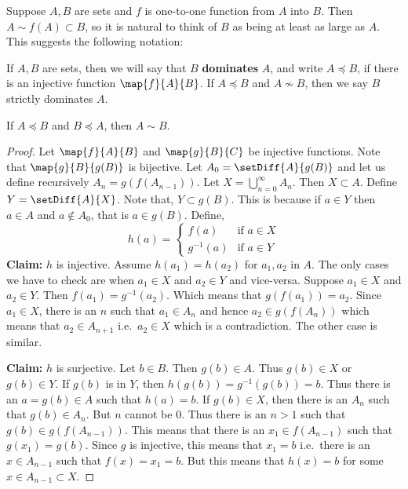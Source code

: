 Suppose $A,B$ are sets and $f$ is one-to-one function from $A$ into $B$. Then $A\sim f(A)\subset B$, so it is
natural to think of $B$ as being at least as large as $A$. This suggests the following notation:
\begin{Definition}
    If $A,B$ are sets, then we will say that $B$ \textbf{dominates} $A$, and write $A \preceq B$, if there is
    an injective function $\map{f}{A}{B}$. If $A\preceq B$ and $A\not\sim B$, then we say $B$ strictly
    dominates $A$.
\end{Definition}
\begin{Theorem}[name=Schroder-Bernstein theorem]
    If $A \preceq B$ and $B \preceq A$, then $A\sim B$.
\end{Theorem}
\begin{proof}
    Let $\map{f}{A}{B}$ and $\map{g}{B}{C}$ be injective functions. Note that $\map{g}{B}{g(B)}$ is bijective.
    Let $A_0 = \setDiff{A}{g(B)}$ and let us define recursively $A_n = g(f(A_{n-1}))$.
    Let $X = \bigcup\limits_{n=0}^{\infty}A_n$. Then $X \subset A$. Define $Y = \setDiff{A}{X}$. Note that, $Y
    \subset g(B)$. This is because if $a \in Y$ then $a \in A$ and $a \not\in A_0$, that is $a \in g(B)$.
    Define,
    \begin{equation*}
	h(a) = 
	\begin{cases}
	    f(a) &\text{if $a\in X$}\\
	    g^{-1}(a) &\text{if $a\in Y$}
	\end{cases}
    \end{equation*}
    \textbf{Claim:} $h$ is injective. 
    Assume $h(a_1) = h(a_2)$ for $a_1,a_2$ in $A$. The only cases we have to check are when $a_1\in X$ and
    $a_2\in Y$ and vice-versa.
    Suppose $a_1\in X$ and $a_2\in Y$. Then $f(a_1) = g^{-1}(a_2)$. Which means that $g(f(a_1)) = a_2$. Since
    $a_1\in X$, there is an $n$ such that $a_1 \in A_n$ and hence $a_2 \in g(f(A_n))$ which means that $a_2
    \in A_{n+1}$ i.e.~$a_2 \in X$ which is a contradiction. The other case is similar.

    \textbf{Claim:} $h$ is surjective. Let $b \in B$. Then $g(b) \in A$. Thus $g(b) \in X$ or $g(b) \in Y$. If
    $g(b)$ is in $Y$, then $h(g(b)) = g^{-1}(g(b)) = b$. Thus there is an $a = g(b) \in A$ such that $h(a) =
    b$. If $g(b) \in X$, then there is an $A_n$ such that $g(b)\in A_n$. But $n$ cannot be $0$. Thus there is
    an $n > 1$ such that $g(b) \in g(f(A_{n-1}))$. This means that there is an $x_1\in f(A_{n-1})$ such that
    $g(x_1) = g(b)$. Since $g$ is injective, this means that $x_1 = b$ i.e.~there is an $x \in A_{n-1}$ such
    that $f(x) = x_1 = b$. But this means that $h(x) = b$ for some $x \in A_{n-1}\subset X$.
\end{proof}


